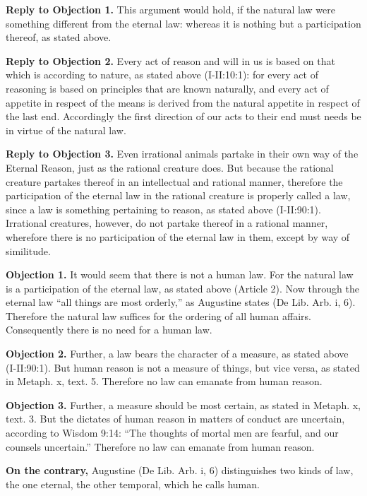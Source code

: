 \textbf{Reply to Objection 1.} This argument would hold, if the natural law were something different from the eternal law: whereas it is nothing but a participation thereof, as stated above.

\textbf{Reply to Objection 2.} Every act of reason and will in us is based on that which is according to nature, as stated above (I-II:10:1): for every act of reasoning is based on principles that are known naturally, and every act of appetite in respect of the means is derived from the natural appetite in respect of the last end. Accordingly the first direction of our acts to their end must needs be in virtue of the natural law.

\textbf{Reply to Objection 3.} Even irrational animals partake in their own way of the Eternal Reason, just as the rational creature does. But because the rational creature partakes thereof in an intellectual and rational manner, therefore the participation of the eternal law in the rational creature is properly called a law, since a law is something pertaining to reason, as stated above (I-II:90:1). Irrational creatures, however, do not partake thereof in a rational manner, wherefore there is no participation of the eternal law in them, except by way of similitude.


\textbf{Objection 1.} It would seem that there is not a human law. For the natural law is a participation of the eternal law, as stated above (Article 2). Now through the eternal law ``all things are most orderly,'' as Augustine states (De Lib. Arb. i, 6). Therefore the natural law suffices for the ordering of all human affairs. Consequently there is no need for a human law.

\textbf{Objection 2.} Further, a law bears the character of a measure, as stated above (I-II:90:1). But human reason is not a measure of things, but vice versa, as stated in Metaph. x, text. 5. Therefore no law can emanate from human reason.

\textbf{Objection 3.} Further, a measure should be most certain, as stated in Metaph. x, text. 3. But the dictates of human reason in matters of conduct are uncertain, according to Wisdom 9:14: ``The thoughts of mortal men are fearful, and our counsels uncertain.'' Therefore no law can emanate from human reason.

\textbf{On the contrary,} Augustine (De Lib. Arb. i, 6) distinguishes two kinds of law, the one eternal, the other temporal, which he calls human.

